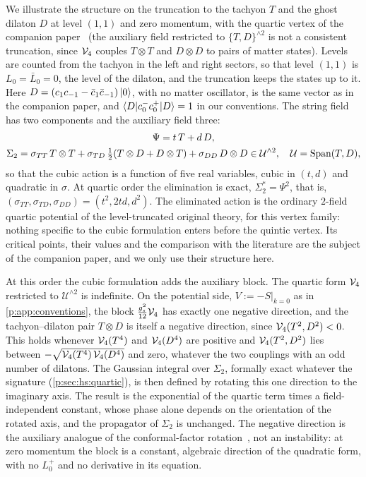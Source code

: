 We illustrate the structure on the truncation to the tachyon $T$ and the ghost dilaton $D$ at level $(1, 1)$ and zero momentum, with the quartic vertex of the companion paper~\cite{Erbin:2026:SL2CVerticesClosed} (the auxiliary field restricted to $\{T, D\}^{\wedge 2}$ is not a consistent truncation, since $\mathcal{V}_{4}$ couples $T \otimes T$ and $D \otimes D$ to pairs of matter states).
Levels are counted from the tachyon in the left and right sectors, so that level $(1, 1)$ is $L_0 = \bar L_0 = 0$, the level of the dilaton, and the truncation keeps the states up to it.
Here $D = (c_1 c_{-1} - \bar c_1 \bar c_{-1}) \ket{0}$, with no matter oscillator, is the same vector as in the companion paper, and $\braket{D | c_0^- c_0^+ | D} = 1$ in our conventions.
The string field has two components and the auxiliary field three:
\begin{equation}
  \label{p:eq:sol:level11}
  \begin{gathered}
  \Psi
    = t \, T + d \, D,
  \\
  \Sigma_2
    = \sigma_{TT} \, T \otimes T
      + \sigma_{TD} \, \tfrac{1}{2} (T \otimes D + D \otimes T)
      + \sigma_{DD} \, D \otimes D
    \in \mathcal U^{\wedge 2},
  \quad
  \mathcal U
    = \operatorname{Span}(T, D),
  \end{gathered}
\end{equation}
so that the cubic action is a function of five real variables, cubic in $(t, d)$ and quadratic in $\sigma$.
At quartic order the elimination is exact, $\Sigma_2^* = \Psi^2$, that is, $(\sigma_{TT}, \sigma_{TD}, \sigma_{DD}) = (t^2, 2 t d, d^2)$.
The eliminated action is the ordinary $2$-field quartic potential of the level-truncated original theory, for this vertex family: nothing specific to the cubic formulation enters before the quintic vertex.
Its critical points, their values and the comparison with the literature are the subject of the companion paper, and we only use their structure here.

At this order the cubic formulation adds the auxiliary block.
The quartic form $\mathcal{V}_{4}$ restricted to $\mathcal U^{\wedge 2}$ is indefinite.
On the potential side, $V := - S \big|_{k = 0}$ as in \cref{p:app:conventions}, the block $\tfrac{g_s^2}{12} \mathcal{V}_{4}$ has exactly one negative direction, and the tachyon--dilaton pair $T \otimes D$ is itself a negative direction, since $\mathcal{V}_{4}(T^2, D^2) < 0$.
This holds whenever $\mathcal{V}_{4}(T^4)$ and $\mathcal{V}_{4}(D^4)$ are positive and $\mathcal{V}_{4}(T^2, D^2)$ lies between $- \sqrt{\mathcal{V}_{4}(T^4) \, \mathcal{V}_{4}(D^4)}$ and zero, whatever the two couplings with an odd number of dilatons.
The Gaussian integral over $\Sigma_2$, formally exact whatever the signature (\cref{p:sec:hs:quartic}), is then defined by rotating this one direction to the imaginary axis.
The result is the exponential of the quartic term times a field-independent constant, whose phase alone depends on the orientation of the rotated axis, and the propagator of $\Sigma_2$ is unchanged.
The negative direction is the auxiliary analogue of the conformal-factor rotation~\cite{Gibbons:1978:PathIntegralsIndefiniteness}, not an instability: at zero momentum the block is a constant, algebraic direction of the quadratic form, with no $L_0^+$ and no derivative in its equation.

